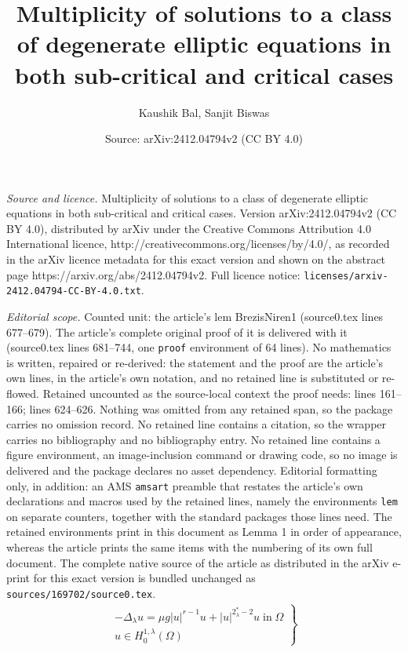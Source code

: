 \documentclass[10pt,a4paper]{amsart}
\title{Multiplicity of solutions to a class of degenerate elliptic equations in both sub-critical and critical cases}
\author{Kaushik Bal, Sanjit Biswas}
\date{Source: arXiv:2412.04794v2 (CC BY 4.0)}
\begin{document}
\maketitle

\noindent\emph{Source and licence.} Multiplicity of solutions to a class of degenerate elliptic equations in both sub-critical and critical cases. Version arXiv:2412.04794v2 (CC BY 4.0), distributed by arXiv under the Creative Commons Attribution 4.0 International licence, http://creativecommons.org/licenses/by/4.0/, as recorded in the arXiv licence metadata for this exact version and shown on the abstract page https://arxiv.org/abs/2412.04794v2. Full licence notice: \texttt{licenses/arxiv-2412.04794-CC-BY-4.0.txt}.\par\smallskip

\noindent\textit{Editorial scope.} Counted unit: the article's lem BrezisNiren1 (source0.tex lines 677--679). The article's complete original proof of it is delivered with it (source0.tex lines 681--744, one \texttt{proof} environment of 64 lines). No mathematics is written, repaired or re-derived: the statement and the proof are the article's own lines, in the article's own notation, and no retained line is substituted or re-flowed.  Retained uncounted as the source-local context the proof needs: lines 161--166; lines 624--626.  Nothing was omitted from any retained span, so the package carries no omission record.  No retained line contains a citation, so the wrapper carries no bibliography and no bibliography entry.  No retained line contains a figure environment, an image-inclusion command or drawing code, so no image is delivered and the package declares no asset dependency.  Editorial formatting only, in addition: an AMS \texttt{amsart} preamble that restates the article's own declarations and macros used by the retained lines, namely the environments \texttt{lem} on separate counters, together with the standard packages those lines need.  The retained environments print in this document as Lemma 1 in order of appearance, whereas the article prints the same items with the numbering of its own full document.  The complete native source of the article as distributed in the arXiv e-print for this exact version is bundled unchanged as \texttt{sources/169702/source0.tex}.
\begin{align}\label{ME1}
    \left. \begin{array}{l}
        -\Delta_\lambda u=\mu g|u|^{r-1}u+|u|^{2^*_\lambda-2}u \;\text{in}\; \Omega \\
         u\in H^{1,\lambda}_0(\Omega)
    \end{array}\right\} \tag{$E_\mu$}
\end{align}
\end{document}
